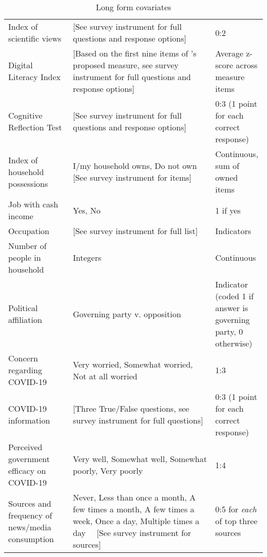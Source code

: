 \begin{table}[H]
\begin{adjustbox}{totalheight=.9\baselineskip}
\begin{tabular}{p{0.25\linewidth}p{0.55\linewidth}p{0.3\linewidth}}
Index   of scientific views                 & [See   survey instrument for full questions and response options] & 0:2                     \\
Digital Literacy Index &  {[}Based on the first nine items of \cite{guess2020digital}'s  proposed measure, see  survey instrument for full questions and response options{]}& Average z-score across measure items\\
Cognitive Reflection Test& {[}See   survey instrument for full questions and response options{]}& 0:3 (1 point for each correct response)\\
Index of household possessions%
&
  I/my household owns, Do not own [See survey instrument for items] &
  Continuous, sum of owned items \\
Job   with cash income                      & Yes,   No                                                  & 1 if yes                \\
Occupation                                  & {[}See   survey instrument for full list{]}                & Indicators              \\
Number   of people in household             & Integers                                                   & Continuous              \\
Political affiliation & Governing party v. opposition & Indicator (coded 1 if answer is governing party, 0 otherwise)\\
Concern regarding COVID-19                  & Very   worried, Somewhat worried, Not at all worried       & 1:3                     \\
COVID-19 information & [Three True/False questions, see survey instrument for full questions] & 0:3 (1 point for each correct response)\\
Perceived government efficacy   on COVID-19 & Very   well, Somewhat well, Somewhat poorly, Very poorly   & 1:4 \\
Sources and frequency of news/media consumption &Never, Less than once a month, A few times a month, A few times a week, Once a day, Multiple times a day \ \  [See survey instrument for sources]  &  0:5 for \textit{each} of top three sources
\end{tabular} 
\end{adjustbox}
\caption{Long form covariates}
\label{cov_long}
\end{table}